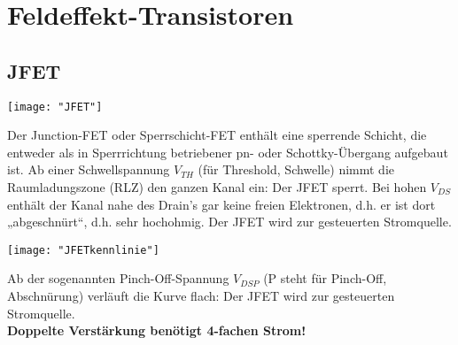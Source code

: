 \section{Feldeffekt-Transistoren}
\subsection{JFET}
\begin{minipage}[t]{0.3\textwidth}
	\vspace{0pt}								%
	\texttt{[image: "JFET"]}
\end{minipage}\hspace{0.05\textwidth}
\begin{minipage}[t]{0.65\textwidth}
	\vspace{0pt}								%
	Der Junction-FET oder Sperrschicht-FET enthält eine sperrende Schicht, die entweder als in
	Sperrrichtung betriebener pn- oder Schottky-Übergang aufgebaut ist.
	Ab einer Schwellspannung $V_{TH}$ (für Threshold, Schwelle) nimmt die Raumladungszone (RLZ) den ganzen Kanal ein:
	Der JFET sperrt. Bei hohen $V_{DS}$ enthält der Kanal nahe des Drain's gar keine freien Elektronen,
	d.h. er ist dort „abgeschnürt“, d.h. sehr hochohmig. Der JFET wird zur gesteuerten
	Stromquelle. \\
\end{minipage}
\vspace{2mm}

\begin{minipage}[t]{0.3\textwidth}
	\vspace{0pt}								%
	\texttt{[image: "JFETkennlinie"]}
\end{minipage}\hspace{0.05\textwidth}
\begin{minipage}[t]{0.65\textwidth}
	\vspace{0pt}								%
	Ab der sogenannten Pinch-Off-Spannung $V_{DSP}$ (P steht für Pinch-Off, Abschnürung) verläuft die
	Kurve flach: Der JFET wird zur gesteuerten Stromquelle.\\
	
	\textbf{Doppelte Verstärkung benötigt 4-fachen Strom!}
\end{minipage}
\vspace{2mm}



